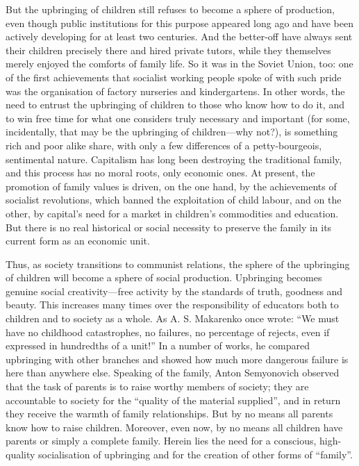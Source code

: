 \documentclass[12pt,a4paper,openany]{book}
\begin{document}
But the upbringing of children still refuses to become a sphere of production, even though public institutions for this purpose appeared long ago and have been actively developing for at least two centuries. And the better-off have always sent their children precisely there and hired private tutors, while they themselves merely enjoyed the comforts of family life. So it was in the Soviet Union, too: one of the first achievements that socialist working people spoke of with such pride was the organisation of factory nurseries and kindergartens. In other words, the need to entrust the upbringing of children to those who know how to do it, and to win free time for what one considers truly necessary and important (for some, incidentally, that may be the upbringing of children—why not?), is something rich and poor alike share, with only a few differences of a petty-bourgeois, sentimental nature. Capitalism has long been destroying the traditional family, and this process has no moral roots, only economic ones. At present, the promotion of family values is driven, on the one hand, by the achievements of socialist revolutions, which banned the exploitation of child labour, and on the other, by capital’s need for a market in children’s commodities and education. But there is no real historical or social necessity to preserve the family in its current form as an economic unit.

Thus, as society transitions to communist relations, the sphere of the upbringing of children will become a sphere of social production. Upbringing becomes genuine social creativity—free activity by the standards of truth, goodness and beauty. This increases many times over the responsibility of educators both to children and to society as a whole. As A. S. Makarenko once wrote: “We must have no childhood catastrophes, no failures, no percentage of rejects, even if expressed in hundredths of a unit!” In a number of works, he compared upbringing with other branches and showed how much more dangerous failure is here than anywhere else. Speaking of the family, Anton Semyonovich observed that the task of parents is to raise worthy members of society; they are accountable to society for the “quality of the material supplied”, and in return they receive the warmth of family relationships. But by no means all parents know how to raise children. Moreover, even now, by no means all children have parents or simply a complete family. Herein lies the need for a conscious, high-quality socialisation of upbringing and for the creation of other forms of “family”.
\end{document}
